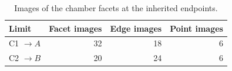 \par
\begin{table}[h]\centering
\caption{Images of the chamber facets at the inherited endpoints.}\label{tab:limits}
\begin{tabular}{@{}lrrr@{}}\toprule
Limit & Facet images & Edge images & Point images\\\midrule
C1 $\to A$ & 32 & 18 & 6\\
C2 $\to B$ & 20 & 24 & 6\\\bottomrule
\end{tabular}
\end{table}\par
